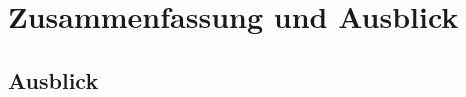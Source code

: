\chapter{Zusammenfassung und Ausblick}
\label{sec:ZusammenfassungUndAusblick}

\section{Ausblick}
\label{sec:Ausblick}
